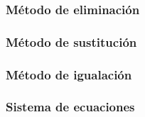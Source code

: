 \documentclass[12pt,addpoints,answers]{evalua}
\begin{document}
\begin{questions}
	\subsubsection{Método de eliminación}
	\question[1]{}
	\subsubsection{Método de sustitución}
	\question[1]{}
	\subsubsection{Método de igualación}
	\question[1]{}
	\subsubsection{Sistema de ecuaciones}
	\question[1]{}
\end{questions}
\end{document}
